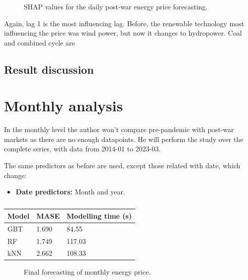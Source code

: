 \begin{figure}[H]
    \caption{SHAP values for the daily post-war energy price forecasting.}
    \label{fig:shap-daily-post}
\end{figure}

Again, lag 1 is the most influencing lag. Before, the renewable technology most influencing the price was wind power, but now it changes to hydropower. Coal and combined cycle are

\subsection{Result discussion}



\section{Monthly analysis}
In the monthly level the author won't compare pre-pandemic with post-war markets as there are no enough datapoints. He will perform the study over the complete series, with data from 2014-01 to 2023-03.

The same predictors as before are used, except those related with date, which change:
\begin{itemize}
    \item \textbf{Date predictors:} Month and year.
\end{itemize}


\begin{table}[H]
\centering
\begin{tabular}{@{}l|l|l@{}}
\toprule
Model & MASE  & Modelling time (s)  \\ \midrule
GBT   & 1.690  & 84.55    \\
RF    & 1.749  & 117.03   \\
kNN   & 2.662  & 108.33   \\ \bottomrule
\end{tabular}
\caption{}
\label{tab:cv-daily}
\end{table}

\begin{figure}[H]
\centering
    \caption{Final forecasting of monthly energy price.}
    \label{fig:forecast-monthly}
\end{figure}

